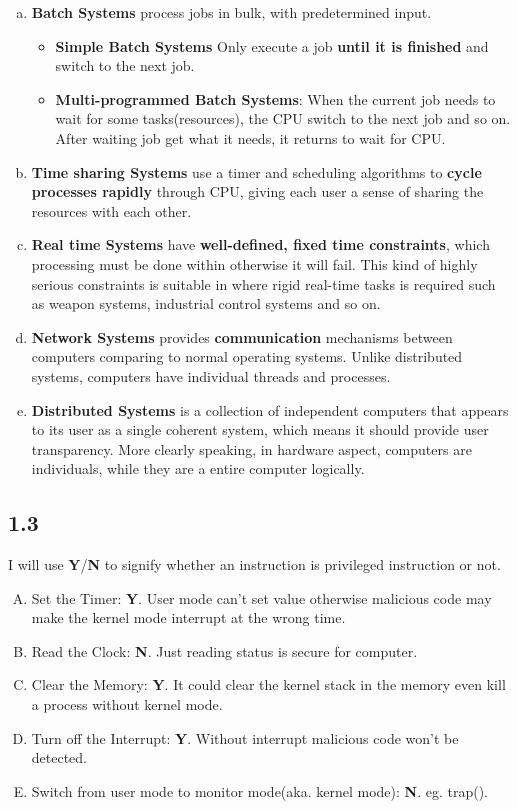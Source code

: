 \documentclass[11pt]{article}
\begin{document}
    \begin{enumerate}[a.]
        \item \textbf{Batch Systems} process jobs in bulk, with predetermined input.
            \begin{itemize}
                \item \textbf{Simple Batch Systems} Only execute a job \textbf{until it is finished} and switch to the next job. 
                \item \textbf{Multi-programmed Batch Systems}: When the current job needs to wait for some tasks(resources), the CPU 
                    switch to the next job and so on. After waiting job get what it needs, it returns to wait for CPU.
            \end{itemize}
        \item \textbf{Time sharing Systems} use a timer and scheduling algorithms to \textbf{cycle processes rapidly} through CPU, giving each 
            user a sense of sharing the resources with each other.
        \item \textbf{Real time Systems} have \textbf{well-defined, fixed time constraints}, which processing must be done within 
        otherwise it will fail. This kind of highly serious constraints is suitable in where rigid real-time tasks is required 
        such as weapon systems, industrial control systems and so on.
        \item \textbf{Network Systems} provides \textbf{communication} mechanisms between computers comparing to normal operating systems.
            Unlike distributed systems, computers have individual threads and processes.
        \item \textbf{Distributed Systems} is a collection of independent computers that appears to its user as a single coherent 
            system, which means it should provide user transparency.
            More clearly speaking, in hardware aspect, computers are individuals, while they are a entire computer logically.
    \end{enumerate}

\subsection*{1.3}
    I will use \textbf{Y}/\textbf{N} to signify whether an instruction is privileged instruction or not.
\begin{enumerate}[A.]
    \item Set the Timer: \textbf{Y}. User mode can't set value otherwise malicious code may make the kernel mode interrupt
        at the wrong time.
    \item Read the Clock: \textbf{N}. Just reading status is secure for computer.
    \item Clear the Memory: \textbf{Y}. It could clear the kernel stack in the memory even kill a process without kernel mode. 
    \item Turn off the Interrupt: \textbf{Y}. Without interrupt malicious code won't be detected.
    \item Switch from user mode to monitor mode(aka. kernel mode): \textbf{N}. eg. trap().
\end{enumerate}
\end{document}

